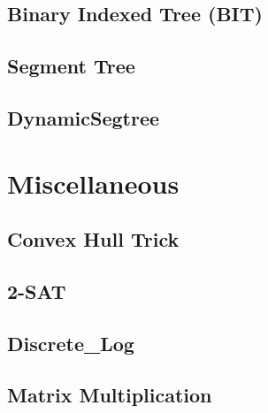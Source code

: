 \documentclass[12pt]{extarticle}
\begin{document}
\begin{multicols*}{2}
\subsection{Binary Indexed Tree (BIT)} %


\subsection{Segment Tree} %


\subsection{DynamicSegtree} %


% 

\section{Miscellaneous}


\subsection{Convex Hull Trick} %


\subsection{2-SAT} %


\subsection{Discrete_Log} %



% 

\subsection{Matrix Multiplication} %



\end{multicols*}
\end{document}
